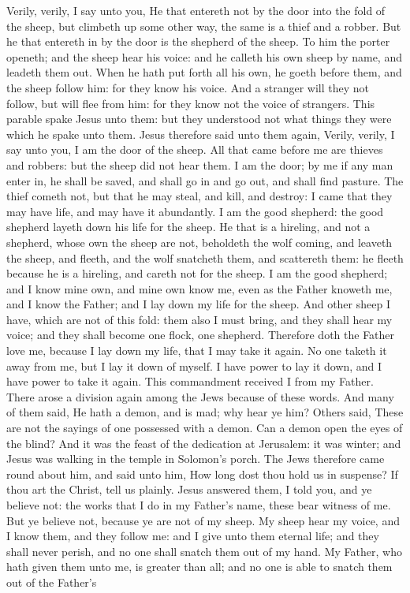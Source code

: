 Verily, verily, I say unto you, He that entereth not by the door into the fold of the sheep, but climbeth up some other way, the same is a thief and a robber. But he that entereth in by the door is the shepherd of the sheep. To him the porter openeth; and the sheep hear his voice: and he calleth his own sheep by name, and leadeth them out. When he hath put forth all his own, he goeth before them, and the sheep follow him: for they know his voice. And a stranger will they not follow, but will flee from him: for they know not the voice of strangers. This parable spake Jesus unto them: but they understood not what things they were which he spake unto them.  Jesus therefore said unto them again, Verily, verily, I say unto you, I am the door of the sheep. All that came before me are thieves and robbers: but the sheep did not hear them. I am the door; by me if any man enter in, he shall be saved, and shall go in and go out, and shall find pasture. The thief cometh not, but that he may steal, and kill, and destroy: I came that they may have life, and may have it abundantly. I am the good shepherd: the good shepherd layeth down his life for the sheep. He that is a hireling, and not a shepherd, whose own the sheep are not, beholdeth the wolf coming, and leaveth the sheep, and fleeth, and the wolf snatcheth them, and scattereth them: he fleeth because he is a hireling, and careth not for the sheep. I am the good shepherd; and I know mine own, and mine own know me, even as the Father knoweth me, and I know the Father; and I lay down my life for the sheep. And other sheep I have, which are not of this fold: them also I must bring, and they shall hear my voice; and they shall become one flock, one shepherd. Therefore doth the Father love me, because I lay down my life, that I may take it again. No one taketh it away from me, but I lay it down of myself. I have power to lay it down, and I have power to take it again. This commandment received I from my Father.  There arose a division again among the Jews because of these words. And many of them said, He hath a demon, and is mad; why hear ye him? Others said, These are not the sayings of one possessed with a demon. Can a demon open the eyes of the blind?  And it was the feast of the dedication at Jerusalem: it was winter; and Jesus was walking in the temple in Solomon’s porch. The Jews therefore came round about him, and said unto him, How long dost thou hold us in suspense? If thou art the Christ, tell us plainly. Jesus answered them, I told you, and ye believe not: the works that I do in my Father’s name, these bear witness of me. But ye believe not, because ye are not of my sheep. My sheep hear my voice, and I know them, and they follow me: and I give unto them eternal life; and they shall never perish, and no one shall snatch them out of my hand. My Father, who hath given them unto me, is greater than all; and no one is able to snatch them out of the Father’s 